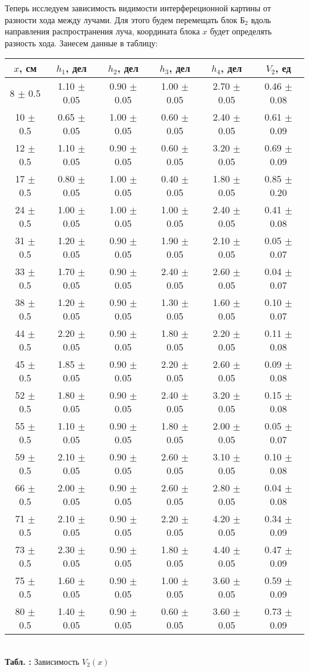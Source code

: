 \documentclass[12pt,a4paper]{article}
\newcounter{tbl}
\newcommand{\embedtbl}[3]{\begin{center}
		\begin{tabular}{#1}
			#2
		\end{tabular}
		\\\textbf{Табл. \thetbl:} #3
		\label{tbl_\thetbl}
		\addtocounter{tbl}{1}
\end{center}}
\begin{document}
	Теперь исследуем зависимость видимости интерфереционной картины от разности хода между лучами. Для этого будем перемещать блок $\text{Б}_2$ вдоль направления распространения луча, координата блока $x$ будет определять разность хода. Занесем данные в таблицу:
	
	\embedtbl{|c|c|c|c|c|c|}{
		\hline
		$x$, см & $h_1$, дел & $h_2$, дел & $h_3$, дел & $h_4$, дел & $V_2$, ед
		\\\hline
		8 $\pm$ 0.5 & 1.10 $\pm$ 0.05 & 0.90 $\pm$ 0.05 & 1.00 $\pm$ 0.05 & 2.70 $\pm$ 0.05 & 0.46 $\pm$ 0.08
		\\\hline
		10 $\pm$ 0.5 & 0.65 $\pm$ 0.05 & 1.00 $\pm$ 0.05 & 0.60 $\pm$ 0.05 & 2.40 $\pm$ 0.05 & 0.61 $\pm$ 0.09
		\\\hline
		12 $\pm$ 0.5 & 1.10 $\pm$ 0.05 & 0.90 $\pm$ 0.05 & 0.60 $\pm$ 0.05 & 3.20 $\pm$ 0.05 & 0.69 $\pm$ 0.09
		\\\hline
		17 $\pm$ 0.5 & 0.80 $\pm$ 0.05 & 1.00 $\pm$ 0.05 & 0.40 $\pm$ 0.05 & 1.80 $\pm$ 0.05 & 0.85 $\pm$ 0.20
		\\\hline
		24 $\pm$ 0.5 & 1.00 $\pm$ 0.05 & 1.00 $\pm$ 0.05 & 1.00 $\pm$ 0.05 & 2.40 $\pm$ 0.05 & 0.41 $\pm$ 0.08
		\\\hline
		31 $\pm$ 0.5 & 1.20 $\pm$ 0.05 & 0.90 $\pm$ 0.05 & 1.90 $\pm$ 0.05 & 2.10 $\pm$ 0.05 & 0.05 $\pm$ 0.07
		\\\hline
		33 $\pm$ 0.5 & 1.70 $\pm$ 0.05 & 0.90 $\pm$ 0.05 & 2.40 $\pm$ 0.05 & 2.60 $\pm$ 0.05 & 0.04 $\pm$ 0.07
		\\\hline
		38 $\pm$ 0.5 & 1.20 $\pm$ 0.05 & 0.90 $\pm$ 0.05 & 1.30 $\pm$ 0.05 & 1.60 $\pm$ 0.05 & 0.10 $\pm$ 0.07
		\\\hline
		44 $\pm$ 0.5 & 2.20 $\pm$ 0.05 & 0.90 $\pm$ 0.05 & 1.80 $\pm$ 0.05 & 2.20 $\pm$ 0.05 & 0.11 $\pm$ 0.08
		\\\hline
		45 $\pm$ 0.5 & 1.85 $\pm$ 0.05 & 0.90 $\pm$ 0.05 & 2.20 $\pm$ 0.05 & 2.60 $\pm$ 0.05 & 0.09 $\pm$ 0.08
		\\\hline
		52 $\pm$ 0.5 & 1.80 $\pm$ 0.05 & 0.90 $\pm$ 0.05 & 2.40 $\pm$ 0.05 & 3.20 $\pm$ 0.05 & 0.15 $\pm$ 0.08
		\\\hline
		55 $\pm$ 0.5 & 1.10 $\pm$ 0.05 & 0.90 $\pm$ 0.05 & 1.80 $\pm$ 0.05 & 2.00 $\pm$ 0.05 & 0.05 $\pm$ 0.07
		\\\hline
		59 $\pm$ 0.5 & 2.10 $\pm$ 0.05 & 0.90 $\pm$ 0.05 & 2.60 $\pm$ 0.05 & 3.10 $\pm$ 0.05 & 0.10 $\pm$ 0.08
		\\\hline
		66 $\pm$ 0.5 & 2.00 $\pm$ 0.05 & 0.90 $\pm$ 0.05 & 2.60 $\pm$ 0.05 & 2.80 $\pm$ 0.05 & 0.04 $\pm$ 0.08
		\\\hline
		71 $\pm$ 0.5 & 2.10 $\pm$ 0.05 & 0.90 $\pm$ 0.05 & 2.20 $\pm$ 0.05 & 4.20 $\pm$ 0.05 & 0.34 $\pm$ 0.09
		\\\hline
		73 $\pm$ 0.5 & 2.30 $\pm$ 0.05 & 0.90 $\pm$ 0.05 & 1.80 $\pm$ 0.05 & 4.40 $\pm$ 0.05 & 0.47 $\pm$ 0.09
		\\\hline
		75 $\pm$ 0.5 & 1.60 $\pm$ 0.05 & 0.90 $\pm$ 0.05 & 1.00 $\pm$ 0.05 & 3.60 $\pm$ 0.05 & 0.59 $\pm$ 0.09
		\\\hline
		80 $\pm$ 0.5 & 1.40 $\pm$ 0.05 & 0.90 $\pm$ 0.05 & 0.60 $\pm$ 0.05 & 3.60 $\pm$ 0.05 & 0.73 $\pm$ 0.09
		\\\hline
		
	}{Зависимость $V_2(x)$}
	
\end{document}
